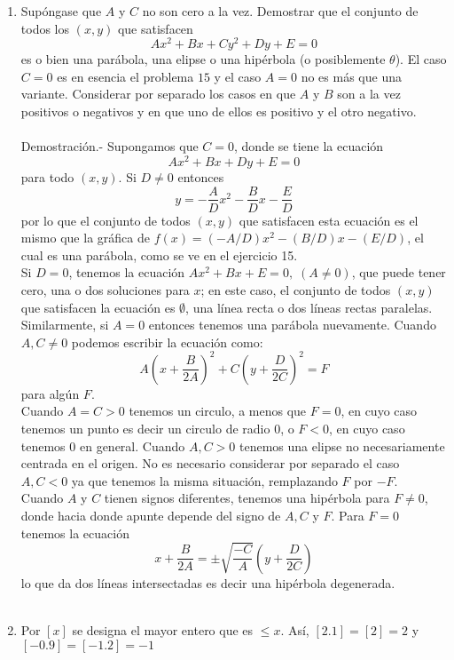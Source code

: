 \begin{enumerate}
    \item Supóngase que $A$ y $C$ no son cero a la vez. Demostrar que el conjunto de todos los $(x,y)$ que satisfacen $$Ax^2 + Bx + Cy^2 +Dy + E = 0$$ es o bien una parábola, una elipse o una hipérbola (o posiblemente $\theta$). El caso $C=0$ es en esencia el problema $15$ y el caso $A=0$ no es más que una variante. Considerar por separado los casos en que $A$ y $B$ son a la vez positivos o negativos y en que uno de ellos es positivo y el otro negativo.\\\\
	Demostración.-\; Supongamos que $C=0$,  donde se tiene la ecuación $$Ax^2 + Bx + Dy + E = 0$$ para todo $(x,y).$ Si $D\neq 0$ entonces $$y=-\dfrac{A}{D}x^2 - \dfrac{B}{D}x -\dfrac{E}{D}$$ por lo que el conjunto de todos $(x, y)$ que satisfacen esta ecuación es el mismo que la gráfica de $f(x)=(-A/D)x^2 - (B/D)x -(E/D)$, el cual es una parábola, como se ve en el ejercicio 15.\\
	Si $D=0$, tenemos la ecuación $Ax^2+Bx+E=0, \; (A\neq 0)$, que puede tener cero, una o dos soluciones para $x$; en este caso, el conjunto de todos $(x, y)$ que satisfacen la ecuación es $\emptyset$, una línea recta o dos líneas rectas paralelas. Similarmente, si $A=0$ entonces tenemos una parábola nuevamente.  Cuando $A,C\neq 0$ podemos escribir la ecuación como: $$A\left(x + \dfrac{B}{2A}\right)^2 + C\left( y + \dfrac{D}{2C} \right)^2=F$$ para algún $F$.\\
	Cuando $A=C > 0$ tenemos un circulo, a menos que $F=0$, en cuyo caso tenemos un punto es decir un circulo de radio $0$, o $F<0$, en cuyo caso tenemos $0$ en general. Cuando $A,C>0$ tenemos una elipse no necesariamente centrada en el origen. No es necesario considerar por separado el caso $A,C<0$ ya que tenemos la misma situación, remplazando $F$ por $-F$.\\
	Cuando $A$ y $C$ tienen signos diferentes, tenemos una hipérbola para $F \neq 0$, donde hacia donde apunte depende del signo de $A,C$ y $F$. Para $F=0$ tenemos la ecuación $$x+\dfrac{B}{2A} = \pm \sqrt{\dfrac{-C}{A}}\left(y + \dfrac{D}{2C}\right)$$ lo que da dos líneas intersectadas es decir una hipérbola degenerada.\\\\

    \item Por $[x]$ se designa el mayor entero que es $\leq x$. Así, $[2.1]=[2]=2$ y $[-0.9]=[-1.2]=-1$
    \begin{enumerate}[\bfseries (i)]
	

\end{enumerate}
\end{enumerate}
